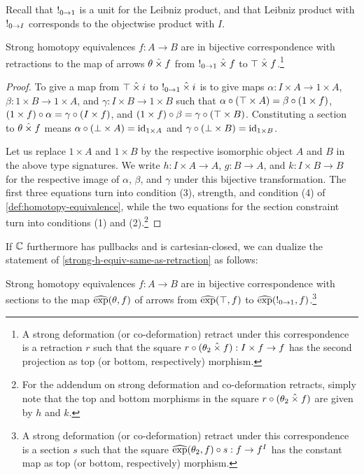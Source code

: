 \documentclass[reqno,10pt,a4paper,oneside]{amsart}
\begin{document}
Recall that $\mathord{!}_{0 \to 1}$ is a unit for the Leibniz product, and that Leibniz product with $\mathord{!}_{0 \to I}$ corresponds to the objectwise product with $I$. 

\begin{lemma}
\label{strong-h-equiv-same-as-retraction}
Strong homotopy equivalences $f : A \to B$ are in bijective correspondence with retractions to the map of arrows $\theta \mathbin{\hat{\times}} f$ from $\mathord{!}_{0 \to 1} \mathbin{\hat{\times}} f$ to $\top \mathbin{\hat{\times}} f$.\footnote{
A strong deformation (or co-deformation) retract under this correspondence is a retraction $r$ such that the square $r \mathbin{\circ} (\theta_2 \mathbin{\hat{\times}} f) : I \times f \to f$ has the second projection as top (or bottom, respectively) morphism.
}
\end{lemma}

\begin{proof}
To give a map from $\top \mathbin{\hat{\times}} i$ to $\mathord{!}_{0 \to 1} \mathbin{\hat{\times}} i$ is to give maps $\alpha : I \times A \to 1 \times A$, $\beta : 1 \times B \to 1 \times A$, and $\gamma : I \times B \to 1 \times B$ such that $\alpha \mathbin{\circ} (\top \times A) = \beta \mathbin{\circ} (1 \times f)$, $(1 \times f) \mathbin{\circ} \alpha = \gamma \mathbin{\circ} (I \times f)$, and $(1 \times f) \mathbin{\circ} \beta = \gamma \mathbin{\circ} (\top \times B)$.
Constituting a section to $\theta \mathbin{\hat{\times}} f$ means $\alpha \mathbin{\circ} (\bot \times A) = \operatorname{id}_{1 \times A}$ and $\gamma \mathbin{\circ} (\bot \times B) = \operatorname{id}_{1 \times B}$.

Let us replace $1 \times A$ and $1 \times B$ by the respective isomorphic object $A$ and $B$ in the above type signatures.
We write $h : I \times A \to A$, $g : B \to A$, and $k : I \times B \to B$ for the respective image of $\alpha$, $\beta$, and $\gamma$ under this bijective transformation.
The first three equations turn into condition (3), strength, and condition (4) of \cref{def:homotopy-equivalence}, while the two equations for the section constraint turn into conditions (1) and (2).\footnote{
For the addendum on strong deformation and co-deformation retracts, simply note that the top and bottom morphisms in the square $r \mathbin{\circ} (\theta_2 \mathbin{\hat{\times}} f)$ are given by $h$ and $k$.
}
\end{proof}

If $\mathbb{C}$ furthermore has pullbacks and is cartesian-closed, we can dualize the statement of \cref{strong-h-equiv-same-as-retraction} as follows:

\begin{corollary}
\label{strong-h-equiv-same-as-section}
Strong homotopy equivalences $f : A \to B$ are in bijective correspondence with sections to the map $\operatorname{\widehat{exp}}(\theta, f)$ of arrows from $\operatorname{\widehat{exp}}(\top, f)$ to $\operatorname{\widehat{exp}}(\mathord{!}_{0 \to 1}, f)$.\footnote{
A strong deformation (or co-deformation) retract under this correspondence is a section $s$ such that the square $\operatorname{\widehat{exp}}(\theta_2, f) \mathbin{\circ} s : f \to f^I$ has the constant map as top (or bottom, respectively) morphism.
}
\end{corollary}
\end{document}
